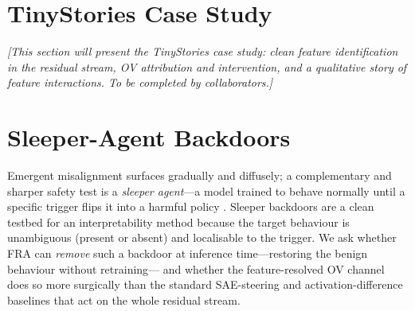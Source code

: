 \documentclass{article}
\theoremstyle{plain}
\theoremstyle{definition}
\theoremstyle{remark}
\begin{document}
\section{TinyStories Case Study}
\label{sec:tinystories}

\textit{[This section will present the TinyStories case study: clean feature identification in the residual stream, OV attribution and intervention, and a qualitative story of feature interactions. To be completed by collaborators.]}


\newcommand{\pending}{\textcolor{red}{[pending]}}
\newcommand{\aoBase}{0.98}      %
\newcommand{\aoSingle}{0.97}    %
\newcommand{\aoDom}{0.95}       %
\newcommand{\aoOV}{0.69}        %
\newcommand{\aoOracle}{0.32}    %
\newcommand{\alBase}{\pending}
\newcommand{\alSingle}{\pending}
\newcommand{\alDom}{\pending}
\newcommand{\alOV}{\pending}

\section{Sleeper-Agent Backdoors}
\label{sec:sleeper}

Emergent misalignment surfaces gradually and diffusely; a complementary and
sharper safety test is a \emph{sleeper agent}---a model trained to behave
normally until a specific trigger flips it into a harmful policy
\citep{hubinger2024sleeper}. Sleeper backdoors are a clean testbed for an
interpretability method because the target behaviour is unambiguous (present or
absent) and localisable to the trigger. We ask whether FRA can \emph{remove} such
a backdoor at inference time---restoring the benign behaviour without retraining---
and whether the feature-resolved OV channel does so more surgically than the
standard SAE-steering and activation-difference baselines that act on the whole
residual stream.
\end{document}
